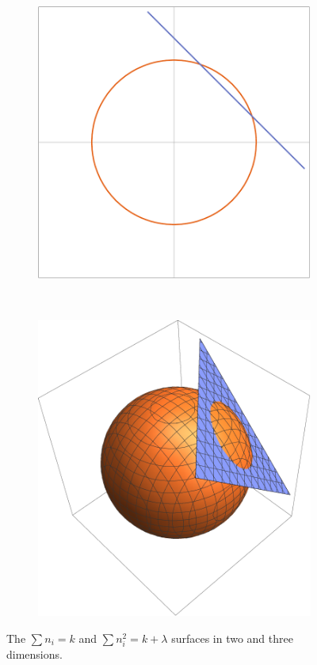 \documentclass{article}
\theoremstyle{plain}
\theoremstyle{definition}
\theoremstyle{remark}
\begin{document}
            \begin{figure}
                \centering
                \begin{subfigure}[b]{0.5\textwidth}
                    \includegraphics[width=\textwidth]{surfacesIn2D}
                \end{subfigure}%
                ~
                \begin{subfigure}[b]{0.5\textwidth}
                    \includegraphics[width=\textwidth]{surfacesIn3D}
                \end{subfigure}
                \caption{The $\sum {n_i} = k$ and $\sum n_i^2 = k + \lambda$ surfaces in two and three dimensions.}
                \label{general:figure:surfaces}
            \end{figure}
                
\end{document}
